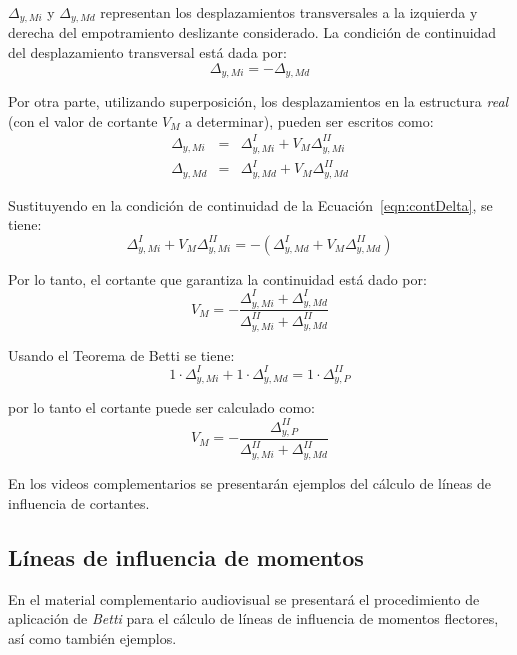 $\Delta_{y,Mi}$ y $\Delta_{y,Md}$ representan los desplazamientos transversales a la izquierda y derecha del empotramiento deslizante considerado. %
%
La condición de continuidad del desplazamiento transversal está dada por:
%
\begin{equation}\label{eqn:contDelta}
\Delta_{y,Mi} = -\Delta_{y,Md}
\end{equation}

Por otra parte, utilizando superposición, los desplazamientos en la estructura \textit{real} (con el valor de cortante $V_M$ a determinar), pueden ser escritos como:
%
\begin{eqnarray}
\Delta_{y,Mi} &=& \Delta_{y,Mi}^I + V_M \Delta_{y,Mi}^{II} \\
\Delta_{y,Md} &=& \Delta_{y,Md}^I + V_M \Delta_{y,Md}^{II} 
\end{eqnarray}

Sustituyendo en la condición de continuidad de la Ecuación~\eqref{eqn:contDelta}, se tiene:
%
\begin{equation}
\Delta_{y,Mi}^I + V_M \Delta_{y,Mi}^{II} = - \left( \Delta_{y,Md}^I + V_M \Delta_{y,Md}^{II}  \right)
\end{equation}

Por lo tanto, el cortante que garantiza la continuidad está dado por:
%
\begin{equation}
V_M  =  - \frac{ \Delta_{y,Mi}^I + \Delta_{y,Md}^{I} } { \Delta_{y,Mi}^{II} + \Delta_{y,Md}^{II} } 
\end{equation}


Usando el Teorema de Betti se tiene:
\begin{equation}
1 \cdot \Delta_{y,Mi}^I + 1\cdot  \Delta_{y,Md}^{I} = 1\cdot  \Delta_{y,P}^{II} 
\end{equation}

por lo tanto el cortante puede ser calculado como:
%
\begin{equation}
\boxed{
V_M  =  - \frac{ \Delta_{y,P}^{II}  } { \Delta_{y,Mi}^{II} + \Delta_{y,Md}^{II} } 
}
\end{equation}

En los videos complementarios se presentarán ejemplos del cálculo de líneas de influencia de cortantes.

\subsection{Líneas de influencia de momentos}

En el material complementario audiovisual se presentará el procedimiento de aplicación de \textit{Betti} para el cálculo de líneas de influencia de momentos flectores, así como también ejemplos.


